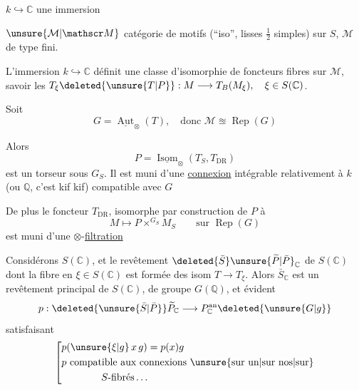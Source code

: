 $k\hookrightarrow\mathbb C$ une immersion

$\unsure{\mathcal M|\mathscr M}$ catégorie de motifs (``iso'', lisses $\frac12$ simples) sur $S$, $\mathcal M$ de type fini.

L'immersion $k\hookrightarrow\mathbb C$ définit une classe d'isomorphie de foncteurs fibres sur $\mathcal M$, savoir les $T_{\xi}\deleted{\unsure{T|P}}:M\longrightarrow T_B(M_{\xi}),\quad \xi\in S(\mathbb C)$.

Soit  
\[
G=\underline{\operatorname{Aut}}_{\otimes}(T),\quad\text{donc }\mathcal M\approxeq\operatorname{Rep}(G)
\]

Alors
\[
P=\underline{\operatorname{Isom}}_{\otimes}(T_S,T_{\mathrm{DR}})
\]
est un torseur sous $G_S$. Il est muni d'une \uline{connexion} intégrable relativement à $k$ (ou $\mathbb Q$, c'est kif kif) compatible avec $G$

De plus le foncteur $T_{\mathrm{DR}}$, isomorphe par construction de $P$ à
\[
M\longmapsto P\mathbin{\times}^{G_S}M_S\qquad\text{sur }\operatorname{Rep}(G)
\]
est muni d'une $\otimes$-\uline{filtration}

 Considérons $S(\mathbb C)$, et le revêtement $\deleted{\bar S}\unsure{\widetilde P|\bar P}_{\mathbb C}$ de $S(\mathbb C)$ dont la fibre en $\xi\in S(\mathbb C)$ est formée des isom $T\longrightarrow T_{\xi}$. Alors $\bar S_{\mathbb C}$ est un revêtement principal de $S(\mathbb C)$, de groupe $G(\mathbb Q)$,  et      évident
\[
p:\deleted{\unsure{\bar S|\bar P}}\widetilde P_{\mathbb C}
\longrightarrow P_{\mathbb C}^{\mathrm{an}}\deleted{\unsure{G|g}}
\]
satisfaisant
\[
\left[\begin{aligned}
&p(\unsure{\xi|g}\,x\,g)=p(x)g\\
&p\ \text{compatible aux connexions \unsure{sur un|sur nos|sur}}\\
&\hspace{4em}S\text{-fibrés}\ldots
\end{aligned}\right.
\]

